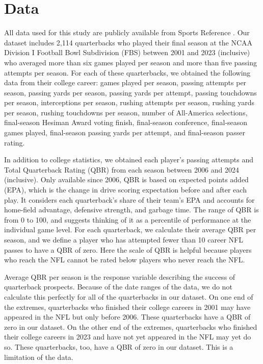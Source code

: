 \documentclass{article}
\begin{document}
\section{Data}
\label{sec:data}

All data used for this study are publicly available from Sports Reference \citep{sports_reference_sports_2025}. Our dataset includes 2,114 quarterbacks who played their final season at the NCAA Division I Football Bowl Subdivision (FBS) between 2001 and 2023 (inclusive) who averaged more than six games played per season and more than five passing attempts per season. For each of these quarterbacks, we obtained the following data from their college career: games played per season, passing attempts per season, passing yards per season, passing yards per attempt, passing touchdowns per season, interceptions per season, rushing attempts per season, rushing yards per season, rushing touchdowns per season, number of All-America selections, final-season Hesiman Award voting finish, final-season conference, final-season games played, final-season passing yards per attempt, and final-season passer rating.

In addition to college statistics, we obtained each player's passing attempts and Total Quarterback Rating (QBR) \citep{burke_how_2016} from each season between 2006 and 2024 (inclusive). Only available since 2006, QBR is based on expected points added (EPA), which is the change in drive scoring expectation before and after each play. It considers each quarterback's share of their team's EPA and accounts for home-field advantage, defensive strength, and garbage time. The range of QBR is from 0 to 100, and \citet{burke_how_2016} suggests thinking of it as a percentile of performance at the individual game level. For each quarterback, we calculate their average QBR per season, and we define a player who has attempted fewer than 10 career NFL passes to have a QBR of zero. Here the scale of QBR is helpful because players who reach the NFL cannot be rated below players who never reach the NFL.

Average QBR per season is the response variable describing the success of quarterback prospects. Because of the date ranges of the data, we do not calculate this perfectly for all of the quarterbacks in our dataset. On one end of the extremes, quarterbacks who finished their college careers in 2001 may have appeared in the NFL but only before 2006. These quarterbacks have a QBR of zero in our dataset. On the other end of the extremes, quarterbacks who finished their college careers in 2023 and have not yet appeared in the NFL may yet do so. These quarterbacks, too, have a QBR of zero in our dataset. This is a limitation of the data.
\end{document}
